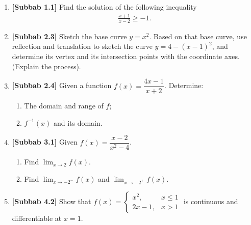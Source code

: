 \documentclass[10pt,openany,a4paper]{article}
\theoremstyle{definition}
\theoremstyle{definition}
\theoremstyle{plain}
\begin{document}
\newpage

\begin{enumerate}
    \item \textbf{[Subbab 1.1]} Find the solution of the following inequality
    \begin{align*}
        \frac{x+1}{x-2}\geq -1.
    \end{align*}

    \item \textbf{[Subbab 2.3]} Sketch the base curve $y=x^2$. Based on that base curve, use reflection and translation to sketch the curve $y=4-(x-1)^2$, and determine its vertex and its intersection points with the coordinate axes. (Explain the process).

    \item \textbf{[Subbab 2.4]} Given a function $f(x)=\dfrac{4x-1}{x+2}$. Determine:
    \begin{enumerate}
        \item[a)] The domain and range of $f$;
        \item[b)] $f^{-1}(x)$ and its domain.
    \end{enumerate}

    \item \textbf{[Subbab 3.1]} Given $f(x)=\dfrac{x-2}{x^2-4}$.
    \begin{enumerate}
        \item[a.] Find $\displaystyle\lim_{x\to 2}f(x)$.
        \item[b.] Find $\displaystyle\lim_{x\to -2^-}f(x)$ and $\displaystyle\lim_{x\to -2^+}f(x)$.
    \end{enumerate}

    \item \textbf{[Subbab 4.2]} Show that $f(x)=\begin{cases}
        x^2, & x\leq 1\\
        2x-1, & x>1
    \end{cases}$ is continuous and differentiable at $x=1$.
\end{enumerate}

\newpage
\end{document}
